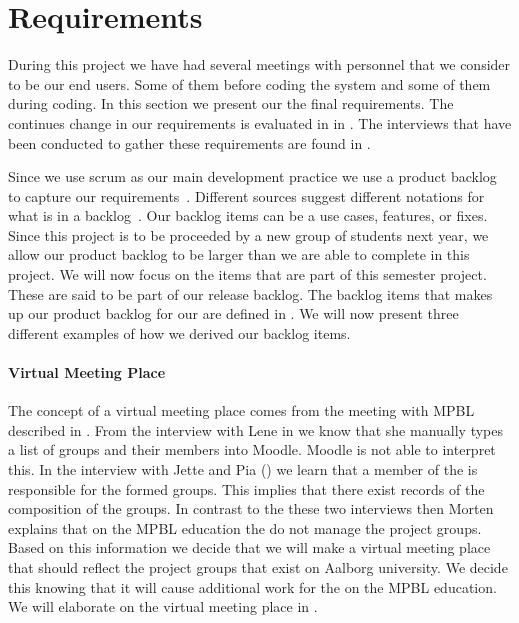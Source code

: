 \section{Requirements}
\label{sec:requirements}
During this project we have had several meetings with personnel that we consider to be our end users.
Some of them before coding the system and some of them during coding.
In this section we present our the final requirements.
The continues change in our requirements is evaluated in  in .
The interviews that have been conducted to gather these requirements are found in .

Since we use scrum as our main development practice we use a product backlog to capture our requirements~\cite[p.~114]{Larman04}.
Different sources suggest different notations for what is in a backlog~\cite[p.~17]{scrumchecklist}\cite[pp.~123-124]{Larman04}.
Our backlog items can be a use cases, features, or fixes.
Since this project is to be proceeded by a new group of students next year, we allow our product backlog to be larger than we are able to complete in this project.
We will now focus on the items that are part of this semester project.
These are said to be part of our release backlog.
The backlog items that makes up our product backlog for our \subsystem{} are defined in .
We will now present three different examples of how we derived our backlog items.

\paragraph{Virtual Meeting Place}
The concept of a virtual meeting place comes from the meeting with MPBL described in . 
From the interview with Lene in  we know that she manually types a list of groups and their members into Moodle.
Moodle is not able to interpret this. 
In the interview with Jette and Pia () we learn that a member of the \admpers{} is responsible for the formed groups. 
This implies that there exist records of the composition of the groups.   
In contrast to the these two interviews then Morten explains that on the MPBL education the \admpers{} do not manage the project groups.
Based on this information we decide that we will make a virtual meeting place that should reflect the project groups that exist on Aalborg university. 
We decide this knowing that it will cause additional work for the \admpers{} on the MPBL education. 
We will elaborate on the virtual meeting place in .

